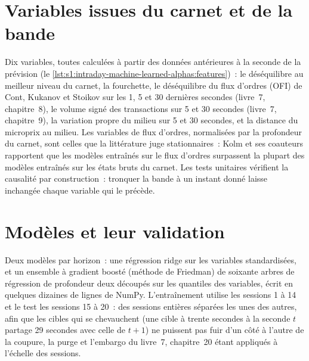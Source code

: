 \section{Variables issues du carnet et de la bande}

Dix variables, toutes calculées à partir des données antérieures à la seconde de la prévision (le \cref{lst:s1:intraday-machine-learned-alphas:features})~: le déséquilibre au meilleur niveau du carnet, la
fourchette, le déséquilibre du flux d'ordres (OFI) de Cont, Kukanov et Stoikov sur les 1, 5 et 30 dernières secondes (livre~7, chapitre~8), le volume signé des transactions sur 5 et 30
secondes (livre~7, chapitre~9), la variation propre du milieu sur 5 et 30 secondes, et la distance du microprix au milieu. Les variables de flux d'ordres, normalisées par la
profondeur du carnet, sont celles que la littérature juge stationnaires~: Kolm et ses coauteurs rapportent que les modèles entraînés sur le flux d'ordres surpassent la plupart des modèles entraînés sur
les états bruts du carnet. Les tests unitaires vérifient la causalité par construction~: tronquer la bande à un instant donné laisse inchangée chaque variable qui le précède.

\section{Modèles et leur validation}

Deux modèles par horizon~: une régression ridge sur les variables standardisées, et un ensemble à gradient boosté (méthode de Friedman) de soixante arbres de régression de profondeur deux
découpés sur les quantiles des variables, écrit en quelques dizaines de lignes de NumPy. L'entraînement utilise les sessions 1 à 14 et le test les sessions 15 à 20~: des sessions entières
séparées les unes des autres, afin que les cibles qui se chevauchent (une cible à trente secondes à la seconde $t$ partage 29 secondes avec celle de $t + 1$) ne puissent pas fuir d'un côté à l'autre de la coupure, la purge
et l'embargo du livre~7, chapitre~20 étant appliqués à l'échelle des sessions.

